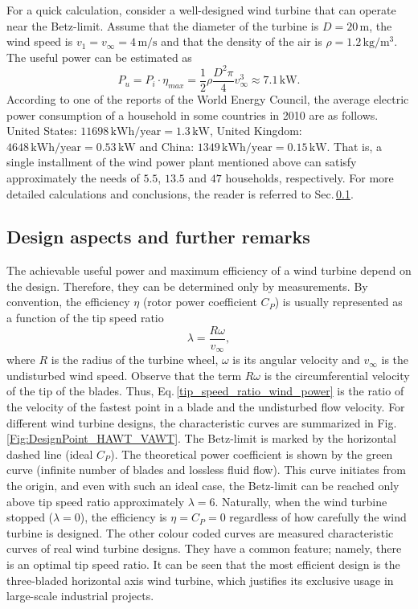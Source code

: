 For a quick calculation, consider a well-designed wind turbine that can operate near the Betz-limit. Assume that the diameter of the turbine is $D=20\,\mathrm{m}$, the wind speed is $v_1=v_{\infty}=4\,\mathrm{m/s}$ and that the density of the air is $\rho=1.2\,\mathrm{kg/m^3}$. The useful power can be estimated as
%
\begin{equation}
P_u = P_i \cdot \eta_{max} = \frac{1}{2} \rho \frac{D^2 \pi}{4} v_{\infty}^3 \approx 7.1\,\mathrm{kW}.
\end{equation}
%
According to one of the reports of the World Energy Council, the average electric power consumption of a household in some countries in 2010 are as follows. United States: $11698\,\mathrm{kWh/year}=1.3\,\mathrm{kW}$, United Kingdom: $4648\,\mathrm{kWh/year}=0.53\,\mathrm{kW}$ and China: $1349\,\mathrm{kWh/year}=0.15\,\mathrm{kW}$. That is, a single installment of the wind power plant mentioned above can satisfy approximately the needs of $5.5$, $13.5$ and $47$ households, respectively. For more detailed calculations and conclusions, the reader is referred to Sec.\,\ref{design_aspects_and_further_remarks}.

\subsection{Design aspects and further remarks} \label{design_aspects_and_further_remarks}
The achievable useful power and maximum efficiency of a wind turbine depend on the design. Therefore, they can be determined only by measurements. By convention, the efficiency $\eta$ (rotor power coefficient $C_P$) is usually represented as a function of the tip speed ratio
%
\begin{equation} \label{tip_speed_ratio_wind_power}
\lambda = \frac{R \omega}{v_{\infty}},
\end{equation}
%
where $R$ is the radius of the turbine wheel, $\omega$ is its angular velocity and $v_{\infty}$ is the undisturbed wind speed. Observe that the term $R \omega$ is the circumferential velocity of the tip of the blades. Thus, Eq.\,\eqref{tip_speed_ratio_wind_power} is the ratio of the velocity of the fastest point in a blade and the undisturbed flow velocity. For different wind turbine designs, the characteristic curves are summarized in Fig.\,\ref{Fig:DesignPoint_HAWT_VAWT}. The Betz-limit is marked by the horizontal dashed line (ideal $C_P$). The theoretical power coefficient is shown by the green curve (infinite number of blades and lossless fluid flow). This curve initiates from the origin, and even with such an ideal case, the Betz-limit can be reached only above tip speed ratio approximately $\lambda=6$. Naturally, when the wind turbine stopped ($\lambda=0$), the efficiency is $\eta=C_P=0$ regardless of how carefully the wind turbine is designed. The other colour coded curves are measured characteristic curves of real wind turbine designs. They have a common feature; namely, there is an optimal tip speed ratio. It can be seen that the most efficient design is the three-bladed horizontal axis wind turbine, which justifies its exclusive usage in large-scale industrial projects.

